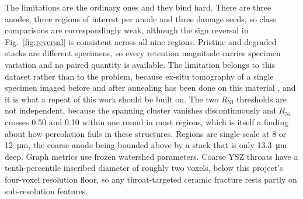 \documentclass[5p,times,twocolumn]{elsarticle}
\newcommand{\Rni}{R_{\mathrm{Ni}}}
\begin{document}
The limitations are the ordinary ones and they bind hard. There are three
anodes, three regions of interest per anode and three damage seeds, so class
comparisons are correspondingly weak, although the sign reversal in
Fig.~\ref{fig:reversal} is consistent across all nine regions. Pristine and
degraded stacks are different specimens, so every retention magnitude carries
specimen variation and no paired quantity is available. The limitation belongs to this dataset rather than to the problem, because
ex-situ tomography of a single
specimen imaged before and after annealing has been done on this material
\cite{trini2021}, and it is what a repeat of this work should be built on.
The two $\Rni$
thresholds are not independent, because the spanning cluster vanishes
discontinuously and $\Rni$ crosses 0.50 and 0.10 within one round in most
regions, which is itself a finding about how percolation fails in these
structures. Regions are single-scale at 8 or \SI{12}{\micro\metre}, the coarse
anode being bounded above by a stack that is only \SI{13.3}{\micro\metre}
deep. Graph metrics use frozen watershed parameters. Coarse YSZ throats have a
tenth-percentile inscribed diameter of roughly two voxels, below this
project's four-voxel resolution floor, so any throat-targeted ceramic fracture
rests partly on sub-resolution features.
\end{document}
